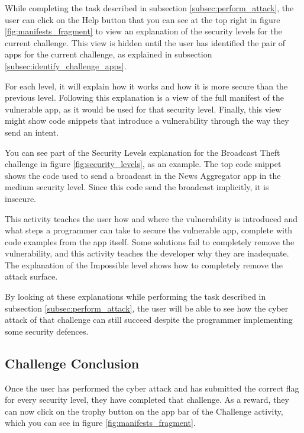     While completing the task described in subsection \ref{subsec:perform_attack}, the user can click on the Help button that you can see at the top right in figure \ref{fig:manifests_fragment} to view an explanation of the security levels for the current challenge. This view is hidden until the user has identified the pair of apps for the current challenge, as explained in subsection \ref{subsec:identify_challenge_apps}.
    
    For each level, it will explain how it works and how it is more secure than the previous level. Following this explanation is a view of the full manifest of the vulnerable app, as it would be used for that security level. Finally, this view might show code snippets that introduce a vulnerability through the way they send an intent.
        
    You can see part of the Security Levels explanation for the Broadcast Theft challenge in figure \ref{fig:security_levels}, as an example. The top code snippet shows the code used to send a broadcast in the News Aggregator app in the medium security level. Since this code send the broadcast implicitly, it is insecure.
    
    This activity teaches the user how and where the vulnerability is introduced and what steps a programmer can take to secure the vulnerable app, complete with code examples from the app itself. Some solutions fail to completely remove the vulnerability, and this activity teaches the developer why they are inadequate. The explanation of the Impossible level shows how to completely remove the attack surface.
    
    By looking at these explanations while performing the task described in subsection \ref{subsec:perform_attack}, the user will be able to see how the cyber attack of that challenge can still succeed despite the programmer implementing some security defences.
    
    \subsection{Challenge Conclusion}
        \label{subsec:challenge_conclusion}
    
    Once the user has performed the cyber attack and has submitted the correct flag for every security level, they have completed that challenge. As a reward, they can now click on the trophy button on the app bar of the Challenge activity, which you can see in figure \ref{fig:manifests_fragment}.
    
